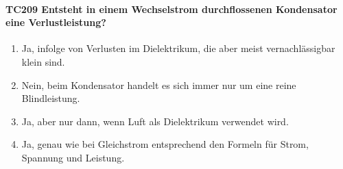 \documentclass[8pt]{article}
\begin{document}
\begin{enumerate}
\begin{enumerate}[nolistsep,label=\Alph*]
{\paragraph*{TC209 Entsteht in einem Wechselstrom durchflossenen Kondensator eine Verlustleistung?}
\begin{enumerate}[nolistsep,label=\Alph*]
\item Ja, infolge von Verlusten im Dielektrikum, die aber meist vernachlässigbar klein sind.
\item Nein, beim Kondensator handelt es sich immer nur um eine reine Blindleistung.
\item Ja, aber nur dann, wenn Luft als Dielektrikum verwendet wird.
\item Ja, genau wie bei Gleichstrom entsprechend den Formeln für Strom, Spannung und Leistung.
\end{enumerate}

\pagebreak
}
\end{enumerate}
\end{enumerate}
\end{document}
